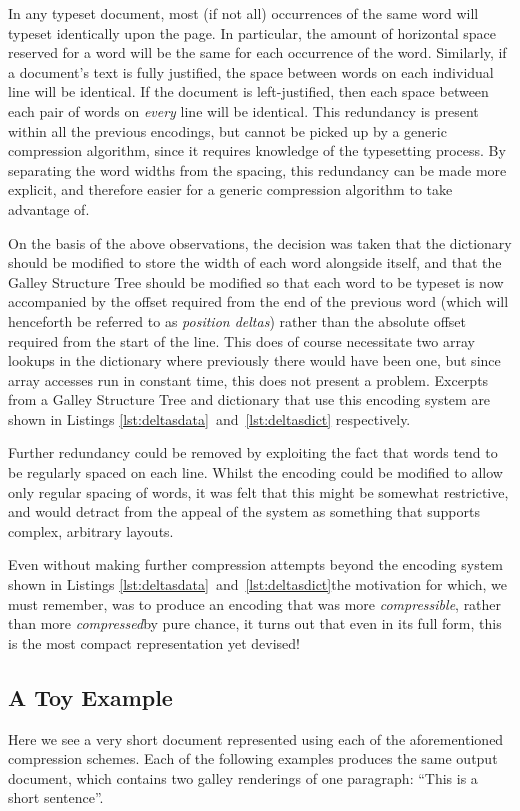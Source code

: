 In any typeset document, most (if not all) occurrences of the same word will typeset identically upon the page. In particular, the amount of horizontal space reserved for a word will be the same for each occurrence of the word. Similarly, if a document's text is fully justified, the space between words on each individual line will be identical. If the document is left-justified, then each space between each pair of words on \emph{every} line will be identical. This redundancy is present within all the previous encodings, but cannot be picked up by a generic compression algorithm, since it requires knowledge of the typesetting process. By separating the word widths from the spacing, this redundancy can be made more explicit, and therefore easier for a generic compression algorithm to take advantage of.

On the basis of the above observations, the decision was taken that the dictionary should be modified to store the width of each word alongside itself, and that the Galley Structure Tree should be modified so that each word to be typeset is now accompanied by the offset required from the end of the previous word (which will henceforth be referred to as \emph{position deltas}) rather than the absolute offset required from the start of the line. This does of course necessitate two array lookups in the dictionary where previously there would have been one, but since array accesses run in constant time, this does not present a problem. Excerpts from a Galley Structure Tree and dictionary that use this encoding system are shown in Listings \ref{lst:deltasdata}~and~\ref{lst:deltasdict} respectively.

Further redundancy could be removed by exploiting the fact that words tend to be regularly spaced on each line. Whilst the encoding could be modified to allow only regular spacing of words, it was felt that this might be somewhat restrictive, and would detract from the appeal of the system as something that supports complex, arbitrary layouts.

Even without making further compression attempts beyond the encoding system shown in Listings \ref{lst:deltasdata}~and~\ref{lst:deltasdict}\ed the motivation for which, we must remember, was to produce an encoding that was more \emph{compressible}, rather than more \emph{compressed}\ed by pure chance, it turns out that even in its full form, this is the most compact representation yet devised!


\clearpage
\subsection{A Toy Example}
Here we see a very short document represented using each of the aforementioned compression schemes. Each of the following examples produces the same output document, which contains two galley renderings of one paragraph: ``This is a short sentence''.

